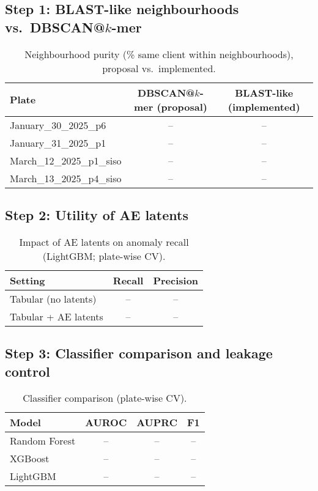 \subsection{Step 1: BLAST-like neighbourhoods vs.\ DBSCAN@$k$-mer}
\begin{table}[H]
\centering
\caption{Neighbourhood purity (\% same client within neighbourhoods), proposal vs.\ implemented.}
\label{tab:step1_purity}
\begin{tabular}{|l|c|c|}
\hline
\textbf{Plate} & \textbf{DBSCAN@$k$-mer (proposal)} & \textbf{BLAST-like (implemented)} \\\hline
January\_30\_2025\_p6  & -- & -- \\\hline
January\_31\_2025\_p1  & -- & -- \\\hline
March\_12\_2025\_p1\_siso & -- & -- \\\hline
March\_13\_2025\_p4\_siso & -- & -- \\\hline
\end{tabular}
\end{table}

\subsection{Step 2: Utility of AE latents}
\begin{table}[H]
\centering
\caption{Impact of AE latents on anomaly recall (LightGBM; plate-wise CV).}
\label{tab:step2_latent_utility}
\begin{tabular}{|l|c|c|}
\hline
\textbf{Setting} & \textbf{Recall} & \textbf{Precision} \\\hline
Tabular (no latents) & -- & -- \\\hline
Tabular + AE latents  & -- & -- \\\hline
\end{tabular}
\end{table}

\subsection{Step 3: Classifier comparison and leakage control}
\begin{table}[H]
\centering
\caption{Classifier comparison (plate-wise CV).}
\label{tab:step3_models}
\begin{tabular}{|l|c|c|c|}
\hline
\textbf{Model} & \textbf{AUROC} & \textbf{AUPRC} & \textbf{F1} \\\hline
Random Forest & -- & -- & -- \\\hline
XGBoost       & -- & -- & -- \\\hline
LightGBM      & -- & -- & -- \\\hline
\end{tabular}
\end{table}

